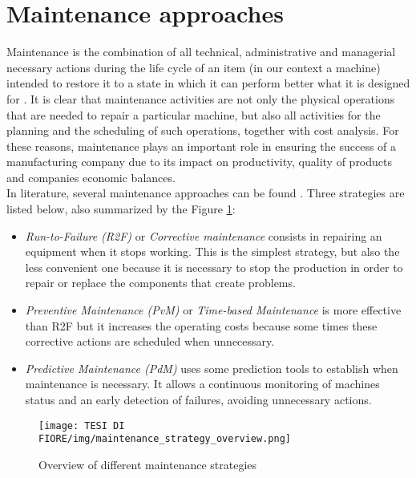 \section{Maintenance approaches}
Maintenance is the combination of all technical, administrative and managerial necessary actions during the life cycle of an item (in our context a machine) intended to restore it to a state in which it can perform better what it is designed for \cite{4maintenanceTransformation}. It is clear that maintenance activities are not only the physical operations that are needed to repair a particular machine, but also all activities for the planning and the scheduling of such operations, together with cost analysis. For these reasons, maintenance plays an important role in ensuring the success of a manufacturing company due to its impact on productivity, quality of products and companies economic balances.\\
In literature, several maintenance approaches can be found \cite{3SystematicLiteratureReviewML}. Three strategies are listed below, also summarized by the Figure \ref{maintenance_strategy_overview}:

\begin{itemize}
\item{\textit{Run-to-Failure (R2F)} or \textit{Corrective maintenance} consists in repairing an equipment when it stops working. This is the simplest strategy, but also the less convenient one because it is necessary to stop the production in order to repair or replace the components that create problems.}
\item{\textit{Preventive Maintenance (PvM)} or \textit{Time-based Maintenance} is more effective than R2F but it increases the operating costs because some times these corrective actions are scheduled when unnecessary.}
\item{\textit{Predictive Maintenance (PdM)} uses some prediction tools to establish when maintenance is necessary. It allows a continuous monitoring of machines status and an early detection of failures, avoiding unnecessary actions.}
\end{itemize}

\begin{figure}[ht]
\texttt{[image: TESI DI FIORE/img/maintenance\_strategy\_overview.png]}
\centering
\caption{Overview of different maintenance strategies \cite{3SystematicLiteratureReviewML}}
\label{maintenance_strategy_overview}
\end{figure}

